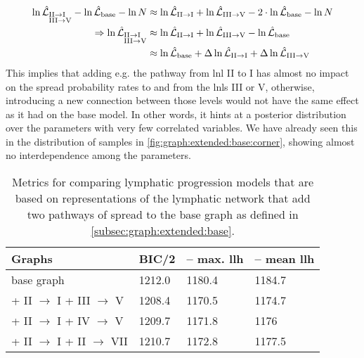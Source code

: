 \documentclass[\relativeRoot/main.tex]{subfiles}
\begin{document}
\begin{equation}
    \begin{aligned}
        \ln{\hat{\mathcal{L}}_{\begin{subarray}{l}\text{II}\rightarrow\text{I} \\ \text{III}\rightarrow\text{V}\end{subarray}}} - \ln{\hat{\mathcal{L}}_\text{base}} - \ln{N} &\approx \ln{\hat{\mathcal{L}}_{\text{II}\rightarrow\text{I}}} + \ln{\hat{\mathcal{L}}_{\text{III}\rightarrow\text{V}}} - 2 \cdot \ln{\hat{\mathcal{L}}_\text{base}} - \ln{N} \\
        \Rightarrow \ln{\hat{\mathcal{L}}_{\begin{subarray}{l}\text{II}\rightarrow\text{I} \\ \text{III}\rightarrow\text{V}\end{subarray}}} &\approx \ln{\hat{\mathcal{L}}_{\text{II}\rightarrow\text{I}}} + \ln{\hat{\mathcal{L}}_{\text{III}\rightarrow\text{V}}} - \ln{\hat{\mathcal{L}}_\text{base}} \\
        &\approx \ln{\hat{\mathcal{L}}_\text{base}} + \Delta\ln{\hat{\mathcal{L}}_{\text{II}\rightarrow\text{I}}} + \Delta\ln{\hat{\mathcal{L}}_{\text{III}\rightarrow\text{V}}}
    \end{aligned}
\end{equation}
%
This implies that adding e.g. the pathway from \gls{lnl} II to I has almost no impact on the spread probability rates to and from the \glspl{lnl} III or V, otherwise, introducing a new connection between those levels would not have the same effect as it had on the base model. In other words, it hints at a posterior distribution over the parameters with very few correlated variables. We have already seen this in the distribution of samples in \cref{fig:graph:extended:base:corner}, showing almost no interdependence among the parameters.

\begin{table}
    \centering
    \begin{tabular}{|l|l|l|l|}
        \hline
        \textbf{Graphs} & \textbf{BIC/2} & \textbf{-- max. llh} & \textbf{-- mean llh} \\
        \hline
        base graph & 1212.0 & 1180.4 & 1184.7 \\
        + II $\rightarrow$ I + III $\rightarrow$ V & 1208.4 & 1170.5 & 1174.7 \\
        + II $\rightarrow$ I + IV $\rightarrow$ V & 1209.7 & 1171.8 & 1176 \\
        + II $\rightarrow$ I + II $\rightarrow$ VII & 1210.7 & 1172.8 & 1177.5 \\
        \hline
    \end{tabular}
    \caption[
        Comparison of graphs that add two new arcs to the base graph
    ]{
        Metrics for comparing lymphatic progression models that are based on representations of the lymphatic network that add two pathways of spread to the base graph as defined in \cref{subsec:graph:extended:base}.
    }
    \label{table:graph:extended:multi-arc}
\end{table}
\end{document}
